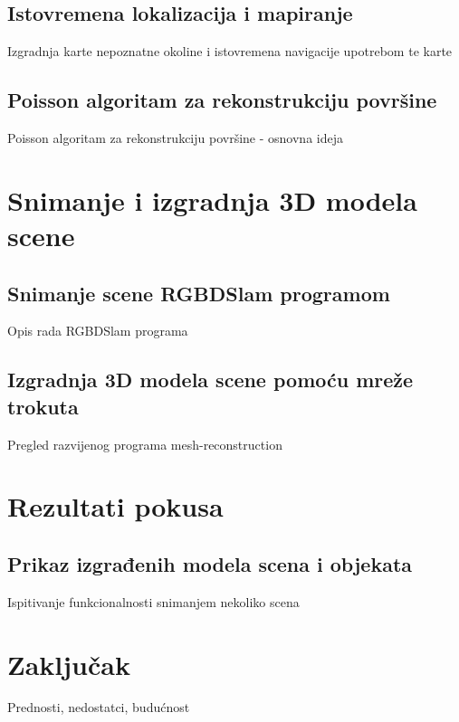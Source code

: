 \documentclass{beamer}
\begin{document}
\subsection{Istovremena lokalizacija i mapiranje}
\begin{frame}{Izgradnja karte nepoznatne okoline i istovremena
    navigacije upotrebom te karte}
    
\end{frame}

\subsection{Poisson algoritam za rekonstrukciju površine}
\begin{frame}{Poisson algoritam za rekonstrukciju površine - osnovna
    ideja}
    
\end{frame}

\section{Snimanje i izgradnja 3D modela scene} 
\subsection{Snimanje scene RGBDSlam programom} 
\begin{frame}{Opis rada RGBDSlam programa}

\end{frame}

\subsection{Izgradnja 3D modela scene pomoću mreže trokuta} 
\begin{frame}{Pregled razvijenog programa mesh-reconstruction}
    
\end{frame}

\section{Rezultati pokusa} 
\subsection{Prikaz izgrađenih modela scena i objekata}
\begin{frame}{Ispitivanje funkcionalnosti snimanjem nekoliko scena}

\end{frame}

\section{Zaključak} 
\begin{frame}{Prednosti, nedostatci, budućnost}

\end{frame}
\end{document}
